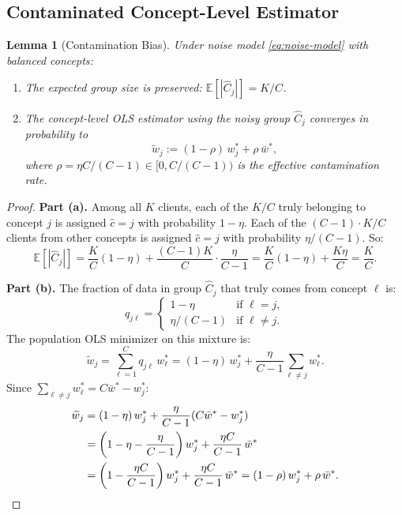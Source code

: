 \documentclass[11pt,a4paper]{article}
\newtheorem{lemma}[theorem]{Lemma}
\newcommand{\E}{\mathbb{E}}
\newcommand{\wbar}{\bar{w}}
\begin{document}
\subsection{Contaminated Concept-Level Estimator}

\begin{lemma}[Contamination Bias]\label{lem:contamination}
Under noise model \eqref{eq:noise-model} with balanced concepts:
\begin{enumerate}[label=(\alph*)]
\item The expected group size is preserved: $\E[|\hat{C}_j|] = K/C$.
\item The concept-level OLS estimator using the noisy group $\hat{C}_j$ converges in probability to
\begin{equation}\label{eq:contam-target}
\widetilde{w}_j := (1 - \rho)\, w_j^* + \rho\, \wbar^*,
\end{equation}
where $\rho = \eta C / (C - 1) \in [0, C/(C-1))$ is the \emph{effective contamination rate}.
\end{enumerate}
\end{lemma}

\begin{proof}
\textbf{Part (a).} Among all $K$ clients, each of the $K/C$ truly belonging to concept $j$ is assigned $\hat{c} = j$ with probability $1 - \eta$. Each of the $(C-1) \cdot K/C$ clients from other concepts is assigned $\hat{c} = j$ with probability $\eta/(C-1)$. So:
\[
\E[|\hat{C}_j|] = \frac{K}{C}(1 - \eta) + \frac{(C-1)K}{C} \cdot \frac{\eta}{C-1} = \frac{K}{C}(1 - \eta) + \frac{K\eta}{C} = \frac{K}{C}.
\]

\textbf{Part (b).} The fraction of data in group $\hat{C}_j$ that truly comes from concept $\ell$ is:
\[
q_{j\ell} = \begin{cases}
1 - \eta & \text{if } \ell = j,\\
\eta/(C-1) & \text{if } \ell \neq j.
\end{cases}
\]
The population OLS minimizer on this mixture is:
\[
\widetilde{w}_j = \sum_{\ell=1}^C q_{j\ell}\, w_\ell^*
= (1 - \eta)\, w_j^* + \frac{\eta}{C-1}\sum_{\ell \neq j} w_\ell^*.
\]
Since $\sum_{\ell \neq j} w_\ell^* = C\wbar^* - w_j^*$:
\begin{align}
\widetilde{w}_j &= (1 - \eta)\, w_j^* + \frac{\eta}{C-1}(C\wbar^* - w_j^*) \notag \\
&= \left(1 - \eta - \frac{\eta}{C-1}\right) w_j^* + \frac{\eta C}{C-1}\, \wbar^* \notag \\
&= \left(1 - \frac{\eta C}{C-1}\right) w_j^* + \frac{\eta C}{C-1}\, \wbar^*
= (1 - \rho)\, w_j^* + \rho\, \wbar^*. \qedhere
\end{align}
\end{proof}
\end{document}
